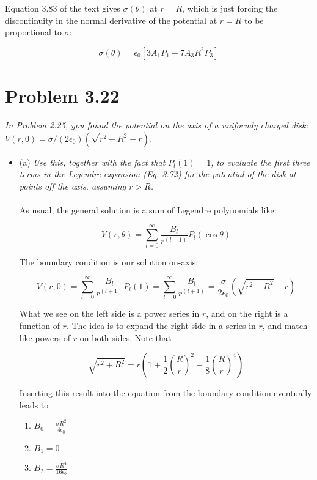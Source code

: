 \documentclass[10pt]{article}
\begin{document}
Equation 3.83 of the text gives $\sigma(\theta)$ at $r = R$, which is just forcing the discontinuity in the normal derivative of the potential at $r = R$ to be proportional to $\sigma$:

\begin{equation}
\sigma(\theta)= \epsilon_0 [3 A_1 P_1 + 7 A_3 R^2 P_3]
\end{equation}

\section{Problem 3.22}

\textit{In Problem 2.25, you found the potential on the axis of a uniformly charged disk: $V(r,0) = \sigma/(2\epsilon_0) \left( \sqrt{r^2 + R^2} - r\right)$.}

\begin{itemize}
\item (a) \textit{Use this, together with the fact that $P_l(1) = 1$, to evaluate the first three terms in the Legendre expansion (Eq. 3.72) for the potential of the disk at points off the axis, assuming $r > R$.} \\ \\
As usual, the general solution is a sum of Legendre polynomials like:

\begin{equation}
V(r,\theta) = \sum_{l=0}^{\infty} \frac{B_l}{r^{(l+1)}} P_l(\cos\theta)
\end{equation}

The boundary condition is our solution on-axis:

\begin{equation}
V(r,0) = \sum_{l=0}^{\infty} \frac{B_l}{r^{(l+1)}} P_l(1) = \sum_{l=0}^{\infty} \frac{B_l}{r^{(l+1)}} = \frac{\sigma}{2\epsilon_0} \left( \sqrt{r^2 + R^2} - r\right)
\end{equation}

What we see on the left side is a power series in $r$, and on the right is a function of $r$.  The idea is to expand the right side in a series in $r$, and match like powers of $r$ on both sides.  Note that

\begin{equation}
\sqrt{r^2 + R^2} = r\left( 1 + \frac{1}{2}\left(\frac{R}{r}\right)^2 - \frac{1}{8}\left(\frac{R}{r}\right)^4\right)
\end{equation}

Inserting this result into the equation from the boundary condition eventually leads to
\begin{enumerate}
\item $B_0 = \frac{\sigma R^2}{4\epsilon_0}$
\item $B_1 = 0$
\item $B_2 = \frac{\sigma R^4}{16 \epsilon_0}$
\end{enumerate}


\end{itemize}
\end{document}
